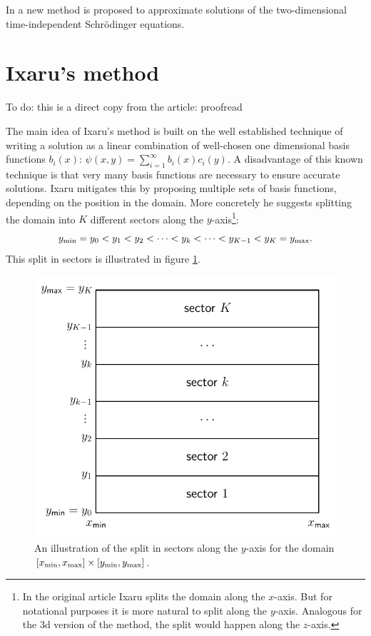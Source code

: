 In \cite{ixaru_new_2010} a new method is proposed to approximate solutions of the two-dimensional time-independent Schrödinger equations.

\section{Ixaru's method}\label{sec:c3_ixarus_method}

{\color{red} To do: this is a direct copy from the article: proofread}

The main idea of Ixaru's method is built on the well established technique \cite{titchmarsh_eigenfunction_1962} of writing a solution as a linear combination of well-chosen one dimensional basis functions $b_i(x)$: $\psi(x, y) = \sum_{i=1}^\infty b_i(x) c_i(y)$. A disadvantage of this known technique is that very many basis functions are necessary to ensure accurate solutions. Ixaru mitigates this by proposing multiple sets of basis functions, depending on the position in the domain. More concretely he suggests splitting the domain into $K$ different sectors along the $y$-axis\footnote{In the original article \cite{ixaru_new_2010} Ixaru splits the domain along the $x$-axis. But for notational purposes it is more natural to split along the $y$-axis. Analogous for the 3d version of the method, the split would happen along the $z$-axis.}:
$$
    {y_{\text{min}}} = y_0 < y_1 < y_2 < \dots < y_k < \dots < y_{K-1} < y_{K} = {y_{\text{max}}}\text{.}
$$
This split in sectors is illustrated in figure \ref{fig:c3_2dsectors}.

\begin{figure}
    \begin{center}
        \includegraphics[width=.6\textwidth]{img/chapter3/2dsectors.pdf}
        \caption{\label{fig:c3_2dsectors} An illustration of the split in sectors along the $y$-axis for the domain $[{x_{\text{min}}}, {x_{\text{max}}}]\times[{y_{\text{min}}}, {y_{\text{max}}}]$.}
    \end{center}
\end{figure}

